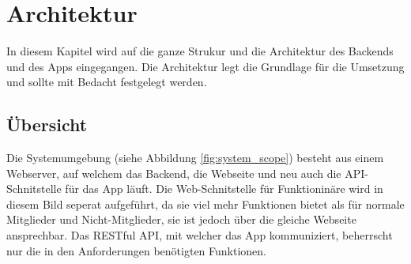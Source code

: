 %
%

\chapter{Architektur}\label{chap.architektur}
In diesem Kapitel wird auf die ganze Strukur und die Architektur des Backends und des Apps eingegangen. Die Architektur legt die Grundlage für die Umsetzung und sollte mit Bedacht festgelegt werden.

\section{Übersicht}\label{architektur_uebersicht}
Die Systemumgebung (siehe Abbildung \ref{fig:system_scope}) besteht aus einem Webserver, auf welchem das Backend, die Webseite und neu auch die API-Schnitstelle für das App läuft. Die Web-Schnitstelle für Funktioninäre wird in diesem Bild seperat aufgeführt, da sie viel mehr Funktionen bietet als für normale Mitglieder und Nicht-Mitglieder, sie ist jedoch über die gleiche Webseite ansprechbar. Das RESTful API, mit welcher das App kommuniziert, beherrscht nur die in den Anforderungen benötigten Funktionen.
